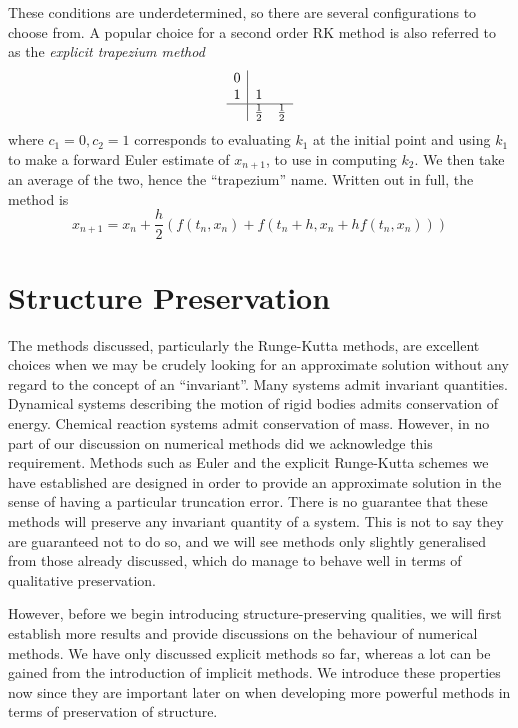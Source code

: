 These conditions are underdetermined, so there are several configurations to choose from.
A popular choice for a second order RK method is also referred to as the \textit{explicit trapezium method}
\begin{equation*}
    \begin{array}{c|cc}
		0 \\
        1  &1 \\
		\hline
		&\frac{1}{2} &\frac{1}{2}
	\end{array}
\end{equation*}
where $c_1 = 0, c_2 = 1$ corresponds to evaluating $k_1$ at the initial point and using $k_1$ to make a forward Euler estimate of $x_{n+1}$, to use in computing $k_2$.
We then take an average of the two, hence the ``trapezium'' name.
Written out in full, the method is
\begin{equation*}
    x_{n+1} = x_n + \frac{h}{2} \left(
        f(t_n, x_n) + f(t_n + h, x_n + h f(t_n, x_n))
    \right)
\end{equation*}

\section{Structure Preservation}

The methods discussed, particularly the Runge-Kutta methods, are excellent choices when we may be crudely looking for an approximate solution without any regard to the concept of an ``invariant''.
Many systems admit invariant quantities.
Dynamical systems describing the motion of rigid bodies admits conservation of energy.
Chemical reaction systems admit conservation of mass.
However, in no part of our discussion on numerical methods did we acknowledge this requirement.
Methods such as Euler and the explicit Runge-Kutta schemes we have established are designed in order to provide an approximate solution in the sense of having a particular truncation error.
There is no guarantee that these methods will preserve any invariant quantity of a system.
This is not to say they are guaranteed not to do so,
and we will see methods only slightly generalised from those already discussed, which do manage to behave well in terms of qualitative preservation.

However, before we begin introducing structure-preserving qualities, we will first establish more results and provide discussions on the behaviour of numerical methods.
We have only discussed explicit methods so far, whereas a lot can be gained from the introduction of implicit methods.
We introduce these properties now since they are important later on when developing more powerful methods in terms of preservation of structure.

